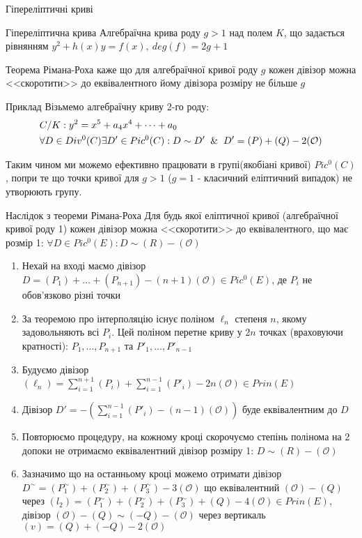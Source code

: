 \documentclass[9pt]{beamer}
\begin{document}
\begin{darkframes}
\begin{frame}{Гіпереліптичні криві}
    \begin{block}{Гіпереліптична крива}
        Алгебраїчна крива роду $g>1$ над полем $K$, що задається рівнянням $y^2 +h(x)y = f(x),\ deg(f) = 2g+1$
    \end{block}
    Теорема Рімана-Роха каже що для алгебраїчної кривої роду $g$ кожен дівізор можна <<скоротити>> до еквівалентного йому дівізора розміру не більше $g$
    \begin{exampleblock}{Приклад}
    Візьмемо алгебраїчну криву 2-го роду:
        \begin{align*}
            & C/K: y^2 = x^5 + a_4x^4 + \dots + a_0 \\
            & \forall D \in Div^0(C) \exists D' \in Pic^0(C): D \sim D' \And D'=(P)+(Q)-2(\mathcal{O})
        \end{align*}
    \end{exampleblock}
    Таким чином ми можемо ефективно працювати в групі(якобіані кривої) $Pic^0(C)$, попри те що точки кривої для $g>1$ ($g=1$ - класичний еліптичний випадок) не утворюють групу.
\end{frame}

\begin{frame}{Наслідок з теореми Рімана-Роха}
    Для будь якої еліптичної кривої (алгебраїчної кривої роду 1) кожен дівізор можна <<скоротити>> до еквівалентного, що має розмір 1: $\forall D \in Pic^0(E): D \sim (R) - (\mathcal{O})$
\begin{enumerate}
    \item Нехай на вході маємо дівізор $D=(P_1) +\dots+(P_{n+1})-(n+1)(\mathcal{O}) \in Pic^0(E)$, де $P_i$ не обов'язково різні точки
    \item За теоремою про інтерполяцію існує поліном $\ell_{n}$ степеня $n$, якому задовольняють всі $P_i$. Цей поліном перетне криву у $2n$ точках (враховуючи кратності): $P_1, \dots, P_{n+1}$ та $P'_1, \dots, P'_{n-1}$
    \item Будуємо дівізор $(\ell_{n})=\sum_{i=1}^{n+1}(P_i) +\sum_{i=1}^{n-1}{(P'_i)} -2n(\mathcal{O}) \in Prin(E)$
    \item Дівізор $D'=-(\sum_{i=1}^{n-1}{(P'_i)}-(n-1)(\mathcal{O}))$ буде еквівалентним до $D$
    \item Повторюємо процедуру, на кожному кроці скорочуємо степінь полінома на 2 допоки не отримаємо еквівалентний дівізор розміру 1: $D \sim (R)-(\mathcal{O})$
    \item Зазначимо що на останньому кроці можемо отримати дівізор $D^\sim = (P_1^\sim) + (P_2^\sim) + (P_3^\sim)-3(\mathcal{O})$ що еквівалентний $(\mathcal{O})-(Q)$ через $(l_2) = (P_1^\sim) + (P_2^\sim) + (P_3^\sim) +(Q)-4(\mathcal{O}) \in Prin(E)$, дівізор $(\mathcal{O})-(Q) \sim (-Q)-(\mathcal{O})$ через вертикаль $(v) = (Q) +(-Q)-2(\mathcal{O})$
    

\end{enumerate}
\end{frame}
\end{darkframes}
\end{document}
